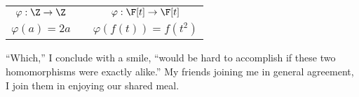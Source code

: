 {\begin{center}
\begin{tabular}{c c c}
$\varphi : \Z \rightarrow \Z$
&
\hspace{0.5in}
&
$\varphi : \F[t] \rightarrow \F[t]$
\\
$\varphi(a) = 2 a$
&
\hspace{0.5in}
&
$\varphi(f(t)) = f(t^{2})$
\end{tabular}
\end{center}
``Which,'' I conclude with a smile, ``would be hard to accomplish if these two homomorphisms were exactly alike.'' My friends joining me in general agreement, I join them in enjoying our shared meal.}